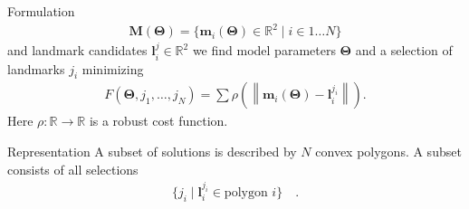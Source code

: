 \documentclass[landscape,final,a0paper,fontscale=0.27065]{baposter}
\newcommand*{\normLR}[1]{\left\| #1 \right\|}%
\newcommand*{\VEC}[1]  {\ensuremath{\boldsymbol{#1}}}
\newcommand{\SRR}{\ensuremath{\mathbb R}}
\renewcommand{\l}{\VEC l}
\newcommand{\Params}{\VEC\Theta}
\begin{document}
\begin{poster}
\begin{posterbox}[name=formulation,column=1,below=results,above=solution1]{Formulation}
\begin{align}
  \VEC M(\Params) = \{\VEC m_i(\Params) \in \SRR^2 \mid i\in 1\dots N\}
\end{align}
and landmark candidates $\l_i^j \in \SRR^2$
we find model parameters $\Params$ and a selection of landmarks $j_i$ 
minimizing
\begin{align}
  F(\Params, j_1, \dots, j_N) = \sum \rho\left( \normLR{ \VEC m_i(\Params) - \l_i^{j_i} } \right).
\end{align}
Here $\rho: \SRR\to\SRR$ is a robust cost function.
  \end{posterbox}
  \begin{posterbox}[name=representation,column=2,above=bottom,below=results]{Representation}
  A subset of solutions is described by $N$ convex polygons. A subset consists of all selections
  \begin{align}
    \{ j_i \mid \l_i^{j_i} \in \text{polygon $i$}\}\quad.
  \end{align}


\end{posterbox}
\end{poster}
\end{document}
